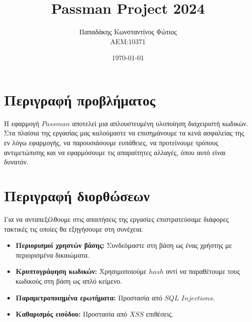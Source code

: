 \documentclass{report}
\begin{document}

\title{\Huge \bfseries {} Passman Project 2024} %
\author{Παπαδάκης Κωνσταντίνος Φώτιος\vspace{0.5cm} \\  ΑΕΜ:10371} %
\date{\today}
\maketitle

\section*{Περιγραφή προβλήματος}
Η εφαρμογή $Passman$ αποτελεί μια απλουστευμένη υλοποίηση διαχειριστή κωδικών. Στα πλαίσια της εργασίας
μας καλούμαστε να επισημάνουμε τα κενά ασφαλείας της εν λόγω εφαρμογής, να παρουσιάσουμε ευπάθειες, να
προτείνουμε τρόπους αντιμετώπισης και να εφαρμόσουμε τις απαραίτητες αλλαγές, όπου αυτό είναι δυνατόν.

\section*{Περιγραφή διορθώσεων}
Για να ανταπεξέλθουμε στις απαιτήσεις της εργασίες επιστρατεύσαμε διάφορες τακτικές τις οποίες θα 
εξηγήσουμε στη συνέχεια.
\begin{itemize}
    \item \textbf{Περιορισμοί χρηστών βάσης:} Συνδεόμαστε στη βάση ως ένας χρήστης με περιορισμένα 
    δικαιώματα.
    \item \textbf{Κρυπτογράφηση κωδικών:} Χρησιμοποιούμε $hash$ αντί να παραθέτουμε τους κωδικούς 
    στη βάση ως απλό κείμενο.
    \item \textbf{Παραμετροποιημένα ερωτήματα:} Προστασία από $SQL$ $Injections$.
    \item \textbf{Καθαρισμός εισόδου:} Προστασία από $XSS$ επιθέσεις.
\end{itemize}
\end{document}
